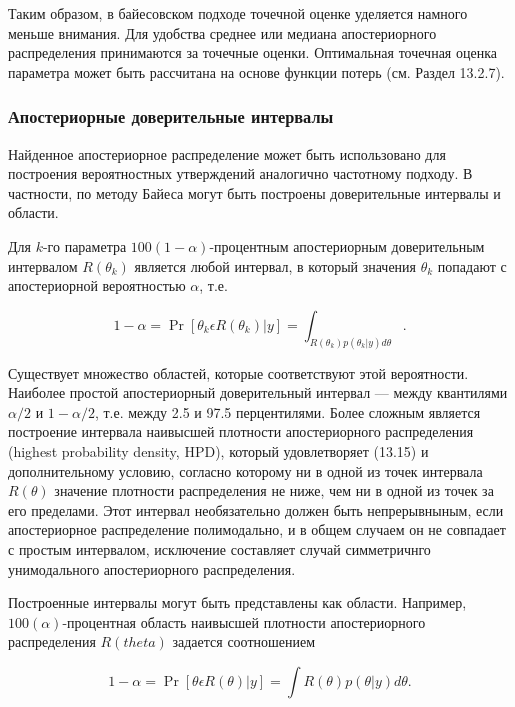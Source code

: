 Таким образом, в байесовском подходе точечной оценке уделяется намного меньше внимания. Для удобства среднее или медиана апостериорного распределения принимаются за точечные оценки. Оптимальная точечная оценка параметра может быть рассчитана на основе функции потерь (см. Раздел 13.2.7).

\subsubsection*{Апостериорные доверительные интервалы}

Найденное апостериорное распределение может быть использовано для построения вероятностных утверждений аналогично частотному подходу. В частности, по методу Байеса могут быть построены доверительные интервалы и области. 

Для $k$-го параметра $100(1-\alpha)$-процентным апостериорным доверительным интервалом $R(\theta_k)$  является любой интервал, в который значения $\theta_k$ попадают  с апостериорной вероятностью $\alpha$, т.е.

\begin{equation}
1-\alpha=\Pr[\theta_k{\epsilon}R(\theta_k)|y]=\int_{R(\theta_k)p(\theta_k|y)d\theta}.
\end{equation}

Существует множество областей, которые соответствуют этой вероятности. Наиболее простой апостериорный доверительный интервал --- между квантилями $\alpha/2$ и $1-{\alpha}/2$, т.е. между 2.5 и 97.5 перцентилями. Более сложным является построение интервала наивысшей плотности апостериорного распределения (highest probability density, HPD), который удовлетворяет (13.15) и   дополнительному условию, согласно которому ни в одной из точек интервала $R(\theta)$ значение плотности распределения не ниже, чем ни в одной из точек за его пределами. Этот интервал необязательно должен быть непрерывныным, если апостериорное распределение полимодально, и в общем случаем он не совпадает с простым интервалом, исключение составляет случай симметричнго унимодального апостериорного распределения.

Построенные интервалы могут быть представлены как области. Например, $100(\alpha)$-процентная область наивысшей плотности апостериорного распределения $R(theta)$ задается соотношением 

\begin{equation}
1-\alpha=\Pr[\theta{\epsilon}R(\theta)|y]=\int R(\theta) p(\theta|y)d\theta.
\end{equation}

